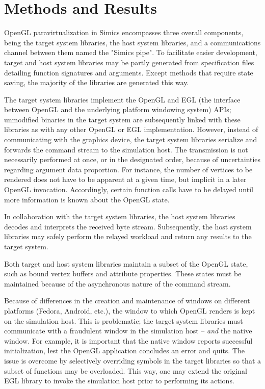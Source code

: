 
\section{Methods and Results}
\label{sec:methodsandresults}
OpenGL paravirtualization in Simics encompasses three overall components, being the target system libraries, the host system libraries, and a communications channel between them named the "Simics pipe".
To facilitate easier development, target and host system libraries may be partly generated from specification files detailing function signatures and arguments.
Except methods that require state saving, the majority of the libraries are generated this way.

The target system libraries implement the OpenGL and EGL (the interface between OpenGL and the underlying platform windowing system) APIs; unmodified binaries in the target system are subsequently linked with these libraries as with any other OpenGL or EGL implementation.
However, instead of communicating with the graphics device, the target system libraries serialize and forwards the command stream to the simulation host.
The transmission is not necessarily performed at once, or in the designated order, because of uncertainties regarding argument data proportion.
For instance, the number of vertices to be rendered does not have to be apparent at a given time, but implicit in a later OpenGL invocation.
Accordingly, certain function calls have to be delayed until more information is known about the OpenGL state.

In collaboration with the target system libraries, the host system libraries decodes and interprets the received byte stream.
Subsequently, the host system libraries may safely perform the relayed workload and return any results to the target system.

Both target and host system libraries maintain a subset of the OpenGL state, such as bound vertex buffers and attribute properties.
These states must be maintained because of the asynchronous nature of the command stream.

Because of differences in the creation and maintenance of windows on different platforms (Fedora, Android, etc.), the window to which OpenGL renders is kept on the simulation host.
This is problematic; the target system libraries must communicate with a fraudulent window in the simulation host -- \textit{and} the native window.
For example, it is important that the native window reports successful initialization, lest the OpenGL application concludes an error and quits.
The issue is overcome by selectively overriding symbols in the target libraries so that a subset of functions may be overloaded.
This way, one may extend the original EGL library to invoke the simulation host prior to performing its actions.

